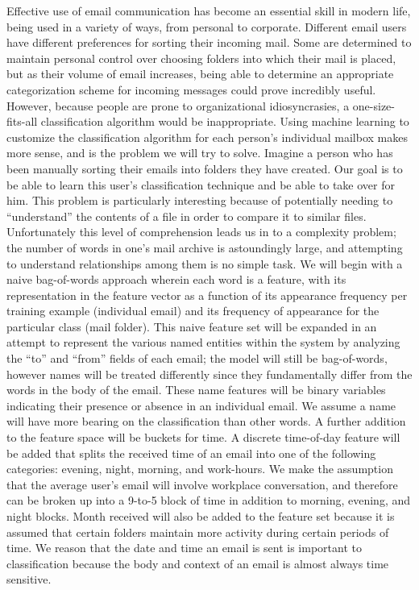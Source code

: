 \documentclass[11pt]{article}
\begin{document}
Effective use of email communication has become an essential skill in modern life, being used in a variety of ways, from personal to corporate.  Different email users have different preferences for sorting their incoming mail.  Some are determined to maintain personal control over choosing folders into which their mail is placed, but as their volume of email increases, being able to determine an appropriate categorization scheme for incoming messages could prove incredibly useful.  However, because people are prone to organizational idiosyncrasies, a one-size-fits-all classification algorithm would be inappropriate.  Using machine learning to customize the classification algorithm for each person's individual mailbox makes more sense, and is the problem we will try to solve.
Imagine a person who has been manually sorting their emails into folders they have created. Our goal is to be able to learn this user’s classification technique and be able to take over for him. This problem is particularly interesting because of potentially needing to “understand” the contents of a file in order to compare it to similar files. 
Unfortunately this level of comprehension leads us in to a complexity problem; the number of words in one’s mail archive is astoundingly large, and attempting to understand relationships among them is no simple task.
We will begin with a naive bag-of-words approach wherein each word is a feature, with its representation in the feature vector as a function of its appearance frequency per training example (individual email) and its frequency of appearance for the particular class (mail folder). This naive feature set will be expanded in an attempt to represent the various named entities within the system by analyzing the “to” and “from” fields of each email; the model will still be bag-of-words, however names will be treated differently since they fundamentally differ from the words in the body of the email. These name features will be binary variables indicating their presence or absence in an individual email. We assume a name will have more bearing on the classification than other words. 
A further addition to the feature space will be buckets for time. A discrete time-of-day feature will be added that splits the received time of an email into one of the following categories: evening, night, morning, and work-hours. We make the assumption that the average user's email will involve workplace conversation, and therefore can be broken up into a 9-to-5 block of time in addition to morning, evening, and night blocks. Month received will also be added to the feature set because it is assumed that certain folders maintain more activity during certain periods of time. We reason that the date and time an email is sent is important to classification because the body and context of an email is almost always time sensitive.
\end{document}
